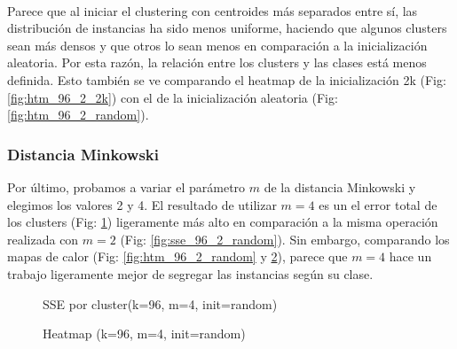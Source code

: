 \documentclass[10pt,a4paper]{article}
\begin{document}
	\paragraph{}
	Parece que al iniciar el clustering con centroides más separados entre sí, las distribución de instancias ha sido menos uniforme, haciendo que algunos clusters sean más densos y que otros lo sean menos en comparación a la inicialización aleatoria. Por esta razón, la relación entre los clusters y las clases está menos definida. Esto también se ve comparando el heatmap de la inicialización 2k (Fig: \ref{fig:htm_96_2_2k}) con el de la inicialización aleatoria (Fig: \ref{fig:htm_96_2_random}).
	
	\subsubsection{Distancia Minkowski}
	Por último, probamos a variar el parámetro $m$ de la distancia Minkowski y elegimos los valores 2 y 4. El resultado de utilizar $m=4$ es un el error total de los clusters (Fig: \ref{fig:sse_96_4_random}) ligeramente más alto en comparación a la misma operación realizada con $m=2$ (Fig: \ref{fig:sse_96_2_random}). Sin embargo, comparando los mapas de calor (Fig: \ref{fig:htm_96_2_random} y \ref{fig:htm_96_4_random}), parece que $m=4$ hace un trabajo ligeramente mejor de segregar las instancias según su clase.
	
	\begin{figure}
		\centering
		\caption{SSE por cluster(k=96, m=4, init=random)}
		\label{fig:sse_96_4_random}
	\end{figure}	
	\begin{figure}
		\centering
		\caption{Heatmap (k=96, m=4, init=random)}
		\label{fig:htm_96_4_random}
	\end{figure}
	
\end{document}
